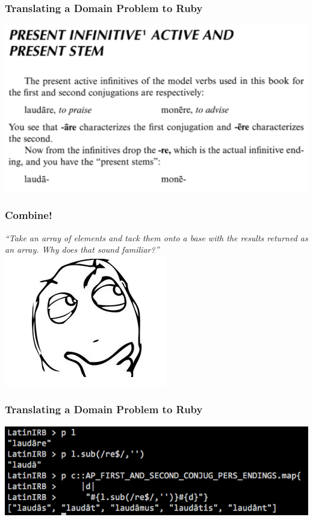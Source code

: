 \documentclass[slidestop,compress,mathserif]{beamer}
\begin{document}
\begin{frame}
	\frametitle{Translating a Domain Problem to Ruby} 
	\includegraphics[scale=0.45]{img/conj_how_2.png}
\end{frame}

\begin{frame}
	\frametitle{Combine!}
	\emph{``Take an array of elements and tack them onto a base with the results
returned as an array. Why does that sound familiar?''}
	\includegraphics[scale=0.45]{img/determined.png}
\end{frame}

\begin{frame}
	\frametitle{Translating a Domain Problem to Ruby} 
	\vskip 1.0cm
	\begin{center}
		\includegraphics[scale=0.45]{img/conj_how_2b.png}	
	\end{center}
\end{frame}
\end{document}
